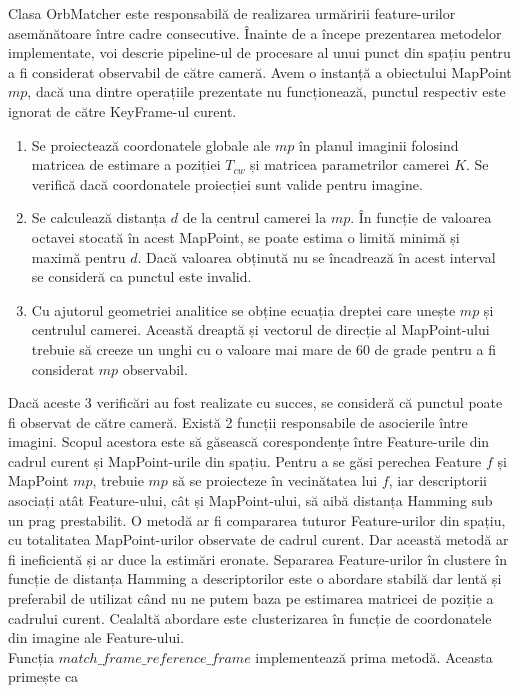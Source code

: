 \documentclass[12pt,a4paper]{report}
\begin{document}
Clasa OrbMatcher este responsabilă de realizarea urmăririi feature-urilor asemănătoare între 
cadre consecutive. Înainte de a începe prezentarea metodelor implementate, voi descrie
pipeline-ul de procesare al unui punct din spațiu pentru a fi considerat observabil de 
către cameră. Avem o instanță a obiectului MapPoint $ mp $, dacă una dintre operațiile
prezentate nu funcționează, punctul respectiv este ignorat de către KeyFrame-ul curent.
\begin{enumerate}
    \item Se proiectează coordonatele globale ale $ mp $ în planul imaginii folosind matricea 
de estimare a poziției $ T_{cw} $ și matricea parametrilor camerei $ K $. Se verifică dacă 
coordonatele proiecției sunt valide pentru imagine.     
    \item Se calculează distanța $ d $ de la centrul camerei la $ mp $. În funcție de valoarea 
octavei stocată în acest MapPoint, se poate estima o limită minimă și maximă pentru $ d $. 
Dacă valoarea obținută nu se încadrează în acest interval se consideră ca punctul este invalid.
    \item Cu ajutorul geometriei analitice se obține ecuația dreptei care unește $ mp $ 
și centrulul camerei. Această dreaptă și vectorul de direcție al MapPoint-ului
trebuie să creeze un unghi cu o valoare mai mare de 60 de grade pentru a fi considerat $ mp $ observabil.
\end{enumerate} 
Dacă aceste 3 verificări au fost realizate cu succes, se consideră că punctul poate fi observat
de către cameră. Există 2 funcții responsabile de asocierile între imagini. Scopul acestora este
să găsească corespondențe între Feature-urile din cadrul curent și MapPoint-urile 
din spațiu. Pentru a se găsi perechea Feature $ f $ și MapPoint $ mp $, trebuie 
$ mp $ să se proiecteze în vecinătatea lui $ f $, iar descriptorii asociați atât Feature-ului, 
cât și  MapPoint-ului, să aibă distanța Hamming sub un  prag prestabilit. O metodă ar fi compararea tuturor
Feature-urilor din spațiu, cu totalitatea MapPoint-urilor observate de cadrul curent. Dar această metodă
ar fi ineficientă și ar duce la estimări eronate. Separarea Feature-urilor în clustere în funcție de distanța
Hamming a descriptorilor este o abordare stabilă dar lentă și preferabil de utilizat când nu ne putem baza pe
estimarea matricei de poziție a cadrului curent. Cealaltă abordare este clusterizarea în funcție de coordonatele
din imagine ale Feature-ului. \\
Funcția $ match\_frame\_reference\_frame $ implementează prima metodă. Aceasta primește ca 
\end{document}
